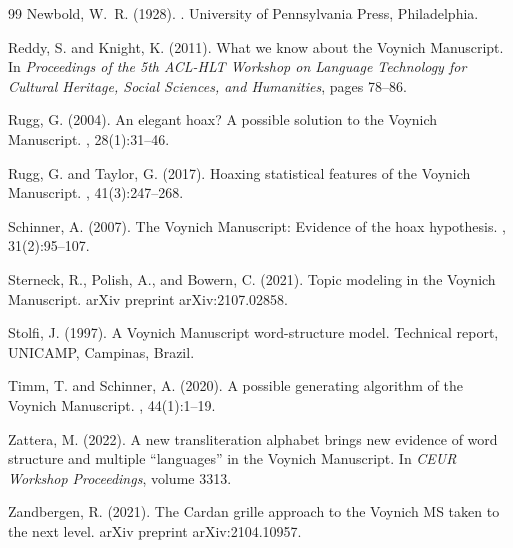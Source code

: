 \documentclass[12pt]{article}
\begin{document}
\begin{thebibliography}{99}
Newbold, W.~R. (1928).
.
\newblock University of Pennsylvania Press, Philadelphia.

Reddy, S. and Knight, K. (2011).
\newblock What we know about the Voynich Manuscript.
\newblock In {\em Proceedings of the 5th ACL-HLT Workshop on Language Technology for Cultural Heritage, Social Sciences, and Humanities}, pages 78--86.

Rugg, G. (2004).
\newblock An elegant hoax? A possible solution to the Voynich Manuscript.
, 28(1):31--46.

Rugg, G. and Taylor, G. (2017).
\newblock Hoaxing statistical features of the Voynich Manuscript.
, 41(3):247--268.

Schinner, A. (2007).
\newblock The Voynich Manuscript: Evidence of the hoax hypothesis.
, 31(2):95--107.

Sterneck, R., Polish, A., and Bowern, C. (2021).
\newblock Topic modeling in the Voynich Manuscript.
\newblock arXiv preprint arXiv:2107.02858.

Stolfi, J. (1997).
\newblock A Voynich Manuscript word-structure model.
\newblock Technical report, UNICAMP, Campinas, Brazil.

Timm, T. and Schinner, A. (2020).
\newblock A possible generating algorithm of the Voynich Manuscript.
, 44(1):1--19.

Zattera, M. (2022).
\newblock A new transliteration alphabet brings new evidence of word structure and multiple ``languages'' in the Voynich Manuscript.
\newblock In {\em CEUR Workshop Proceedings}, volume 3313.

Zandbergen, R. (2021).
\newblock The Cardan grille approach to the Voynich MS taken to the next level.
\newblock arXiv preprint arXiv:2104.10957.

\end{thebibliography}
\end{document}
